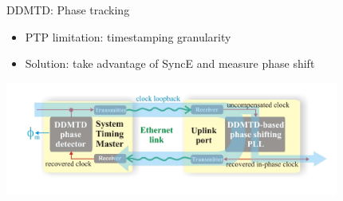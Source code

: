 \documentclass[compress,red]{beamer}
\begin{document}
\begin{frame}{DDMTD: Phase tracking}

\small
    \begin{itemize}
      \item PTP limitation: timestamping granularity
      \item Solution: take advantage of SyncE and measure phase shift
    \end{itemize}

  \begin{center}
  \includegraphics[height=3.7cm]{../../figures/misc/phase_tracking_v2.jpg}
  \end{center}

\end{frame}
\end{document}
